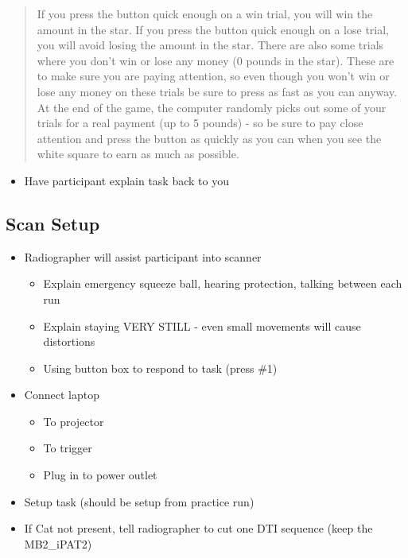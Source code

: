 \documentclass[
]{book}
\providecommand{\tightlist}{%
  \setlength{\itemsep}{0pt}\setlength{\parskip}{0pt}}
\begin{document}
\begin{quote}
If you press the button quick enough on a win trial, you will win the amount in the star. If you press the button quick enough on a lose trial, you will avoid losing the amount in the star. There are also some trials where you don't win or lose any money (0 pounds in the star). These are to make sure you are paying attention, so even though you won't win or lose any money on these trials be sure to press as fast as you can anyway. At the end of the game, the computer randomly picks out some of your trials for a real payment (up to 5 pounds) - so be sure to pay close attention and press the button as quickly as you can when you see the white square to earn as much as possible.
\end{quote}

\begin{itemize}
\tightlist
\item
  Have participant explain task back to you
\end{itemize}

\hypertarget{scan-setup}{%
\subsection{Scan Setup}\label{scan-setup}}

\begin{itemize}
\tightlist
\item
  Radiographer will assist participant into scanner

  \begin{itemize}
  \tightlist
  \item
    Explain emergency squeeze ball, hearing protection, talking between each run
  \item
    Explain staying VERY STILL - even small movements will cause distortions
  \item
    Using button box to respond to task (press \#1)
  \end{itemize}
\item
  Connect laptop

  \begin{itemize}
  \tightlist
  \item
    To projector
  \item
    To trigger
  \item
    Plug in to power outlet
  \end{itemize}
\item
  Setup task (should be setup from practice run)
\item
  If Cat not present, tell radiographer to cut one DTI sequence (keep the MB2\_iPAT2)
\end{itemize}
\end{document}
